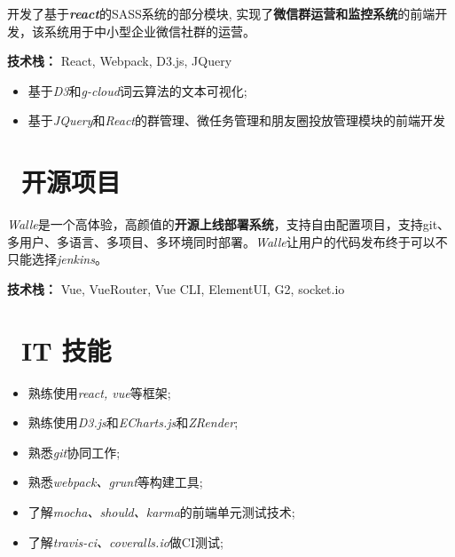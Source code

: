 \documentclass{resume}
\begin{document}
\begin{onehalfspacing}
开发了基于\textit{\textbf{react}}的SASS系统的部分模块, 实现了\textbf{微信群运营和监控系统}的前端开发，该系统用于中小型企业微信社群的运营。


\textbf{技术栈：} React, Webpack, D3.js, JQuery
\begin{itemize}
  \item 基于\textit{D3}和\textit{g-cloud}词云算法的文本可视化;
  \item 基于\textit{JQuery}和\textit{React}的群管理、微任务管理和朋友圈投放管理模块的前端开发
\end{itemize}
\end{onehalfspacing}


\section{\faUsers\ 开源项目}

\begin{onehalfspacing}
\textit{Walle}是一个高体验，高颜值的\textbf{开源上线部署系统}，支持自由配置项目，支持git、多用户、多语言、多项目、多环境同时部署。\textit{Walle}让用户的代码发布终于可以不只能选择\textit{jenkins}。


\textbf{技术栈：} Vue, VueRouter, Vue CLI, ElementUI, G2, socket.io
\end{onehalfspacing}

\section{\faCogs\ IT 技能}
\begin{itemize}[parsep=0.5ex]
  \item 熟练使用\textit{react, vue}等框架;
  \item 熟练使用\textit{D3.js}和\textit{ECharts.js}和\textit{ZRender};
  \item 熟悉\textit{git}协同工作;
  \item 熟悉\textit{webpack、grunt}等构建工具;
  \item 了解\textit{mocha、should、karma}的前端单元测试技术;
  \item 了解\textit{travis-ci、coveralls.io}做CI测试;
\end{itemize}
\end{document}
